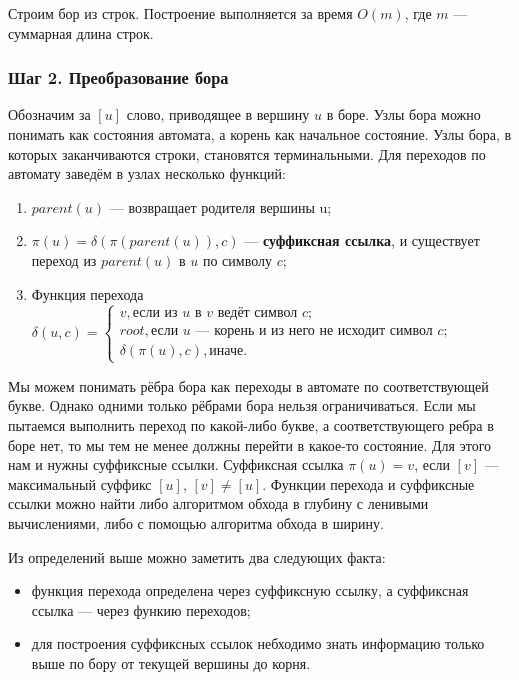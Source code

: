 Строим бор из строк.
Построение выполняется за время $O(m)$, где $m$ --- суммарная длина строк.

\subsubsection{Шаг 2. Преобразование бора}

Обозначим за $[u]$ слово, приводящее в вершину $u$ в боре.
Узлы бора можно понимать как состояния автомата, а корень как начальное состояние.
Узлы бора, в которых заканчиваются строки, становятся терминальными.
Для переходов по автомату заведём в узлах несколько функций:

\begin{enumerate}
    \item $parent(u)$ — возвращает родителя вершины u;
    \item $\pi(u)=\delta(\pi(parent(u)),c)$ --- \textbf{суффиксная ссылка}, и существует переход из $parent(u)$ в $u$ по символу $c$;
    \item Функция перехода $\delta(u, c)=\begin{cases}
    v, \text{если из $u$ в $v$ ведёт символ $c$};\\
    root, \text{если $u$ --- корень и из него не исходит символ $c$};\\
    \delta(\pi(u), c), \text{иначе}.
    \end{cases}$
\end{enumerate}

Мы можем понимать рёбра бора как переходы в автомате по соответствующей букве.
Однако одними только рёбрами бора нельзя ограничиваться.
Если мы пытаемся выполнить переход по какой-либо букве, а соответствующего ребра в боре нет, то мы тем не менее должны перейти в какое-то состояние.
Для этого нам и нужны суффиксные ссылки.
Суффиксная ссылка $\pi(u)=v$, если $[v]$ --- максимальный суффикс $[u]$, $[v]\not=[u]$.
Функции перехода и суффиксные ссылки можно найти либо алгоритмом обхода в глубину с ленивыми вычислениями, либо с помощью алгоритма обхода в ширину. 

Из определений выше можно заметить два следующих факта:

\begin{itemize}
    \item функция перехода определена через суффиксную ссылку, а суффиксная ссылка — через функию переходов;
    \item для построения суффиксных ссылок небходимо знать информацию только выше по бору от текущей вершины до корня.
\end{itemize}

